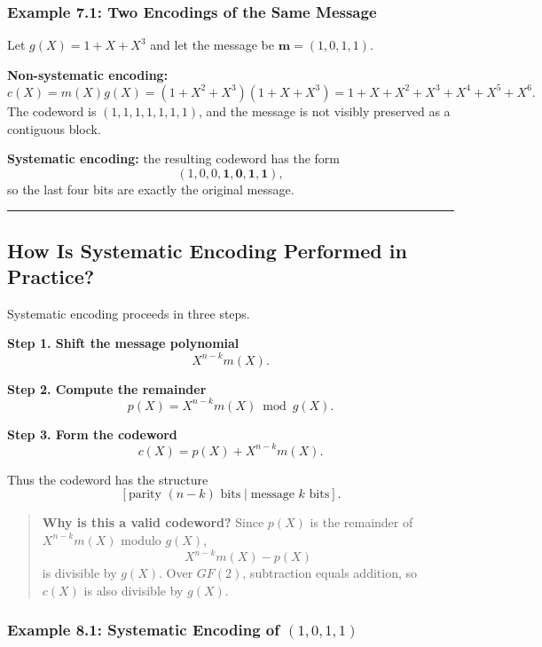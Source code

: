 \documentclass[
]{article}
\begin{document}
\subsubsection{Example 7.1: Two Encodings of the Same
Message}\label{example-7.1-two-encodings-of-the-same-message}

Let \(g(X)=1+X+X^3\) and let the message be \(\mathbf{m}=(1,0,1,1)\).

\textbf{Non-systematic encoding:}
\[c(X)=m(X)g(X)=(1+X^2+X^3)(1+X+X^3)=1+X+X^2+X^3+X^4+X^5+X^6.\] The
codeword is \((1,1,1,1,1,1,1)\), and the message is not visibly
preserved as a contiguous block.

\textbf{Systematic encoding:} the resulting codeword has the form
\[(1,0,0,\mathbf{1,0,1,1}),\] so the last four bits are exactly the
original message.

\begin{center}\rule{0.5\linewidth}{0.5pt}\end{center}

\subsection{How Is Systematic Encoding Performed in
Practice?}\label{how-is-systematic-encoding-performed-in-practice}

Systematic encoding proceeds in three steps.

\textbf{Step 1. Shift the message polynomial} \[X^{n-k}m(X).\]

\textbf{Step 2. Compute the remainder} \[p(X)=X^{n-k}m(X) \bmod g(X).\]

\textbf{Step 3. Form the codeword} \[c(X)=p(X)+X^{n-k}m(X).\]

Thus the codeword has the structure
\[[\text{parity }(n-k)\text{ bits} \mid \text{message }k\text{ bits}].\]

\begin{quote}
\textbf{Why is this a valid codeword?} Since \(p(X)\) is the remainder
of \(X^{n-k}m(X)\) modulo \(g(X)\), \[X^{n-k}m(X)-p(X)\] is divisible by
\(g(X)\). Over \(GF(2)\), subtraction equals addition, so \(c(X)\) is
also divisible by \(g(X)\).
\end{quote}

\subsubsection{\texorpdfstring{Example 8.1: Systematic Encoding of
\((1,0,1,1)\)}{Example 8.1: Systematic Encoding of (1,0,1,1)}}\label{example-8.1-systematic-encoding-of-1011}
\end{document}
